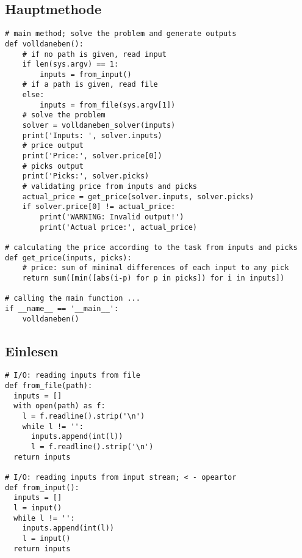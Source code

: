 \documentclass[a4paper,10pt,ngerman]{scrartcl}
\begin{document}
\subsection{Hauptmethode} 
\begin{lstlisting}[frame=single]
# main method; solve the problem and generate outputs
def volldaneben():
    # if no path is given, read input
    if len(sys.argv) == 1:
        inputs = from_input()
    # if a path is given, read file
    else:                                                                           
        inputs = from_file(sys.argv[1])
    # solve the problem
    solver = volldaneben_solver(inputs)
    print('Inputs: ', solver.inputs)
    # price output
    print('Price:', solver.price[0])
    # picks output
    print('Picks:', solver.picks)
    # validating price from inputs and picks
    actual_price = get_price(solver.inputs, solver.picks)
    if solver.price[0] != actual_price:
        print('WARNING: Invalid output!')
        print('Actual price:', actual_price)

# calculating the price according to the task from inputs and picks
def get_price(inputs, picks):
    # price: sum of minimal differences of each input to any pick
    return sum([min([abs(i-p) for p in picks]) for i in inputs])

# calling the main function ...
if __name__ == '__main__':
    volldaneben()
\end{lstlisting}
\subsection{Einlesen}
\begin{lstlisting}[frame=single]
# I/O: reading inputs from file
def from_file(path):
  inputs = []
  with open(path) as f:
    l = f.readline().strip('\n')
    while l != '':
      inputs.append(int(l))
      l = f.readline().strip('\n')
  return inputs

# I/O: reading inputs from input stream; < - opeartor
def from_input():
  inputs = []
  l = input()
  while l != '':
    inputs.append(int(l))
    l = input()
  return inputs
\end{lstlisting}
\end{document}
